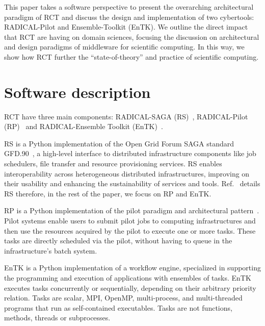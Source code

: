 \documentclass[preprint,12pt, a4paper]{elsarticle}
\begin{document}
This paper takes a software perspective to present the overarching
architectural paradigm of RCT and discuss the design and implementation of
two cybertools: RADICAL-Pilot and Ensemble-Toolkit (EnTK). We outline the
direct impact that RCT are having on domain sciences, focusing the discussion
on architectural and design paradigms of middleware for scientific computing.
In this way, we show how RCT further the ``state-of-theory'' and practice of
scientific computing.


\section{Software description}\label{sec:description}



RCT have three main components: RADICAL-SAGA (RS)~\cite{merzky2015saga},
RADICAL-Pilot (RP)~\cite{merzky2018using} and RADICAL-Ensemble Toolkit
(EnTK)~\cite{balasubramanian2016ensemble,balasubramanian2018harnessing}.

RS is a Python implementation of the Open Grid Forum SAGA standard
GFD.90~\cite{goodale2006saga}, a high-level interface to distributed
infrastructure components like job schedulers, file transfer and resource
provisioning services. RS enables interoperability across heterogeneous
distributed infrastructures, improving on their usability and enhancing the
sustainability of services and tools. Ref.~\cite{merzky2015saga} details RS
therefore, in the rest of the paper, we focus on RP and EnTK.

RP is a Python implementation of the pilot paradigm and architectural
pattern~\cite{turilli2018comprehensive}. Pilot systems enable users to submit
pilot jobs to computing infrastructures and then use the resources acquired
by the pilot to execute one or more tasks. These tasks are directly scheduled
via the pilot, without having to queue in the infrastructure's batch system.

EnTK is a Python implementation of a workflow engine, specialized in
supporting the programming and execution of applications with ensembles of
tasks. EnTK %
executes tasks concurrently or sequentially, depending on their arbitrary
priority relation. Tasks are scalar, MPI, OpenMP, multi-process, and
multi-threaded programs that run as self-contained executables. Tasks are not
functions, methods, threads or subprocesses.
\end{document}
